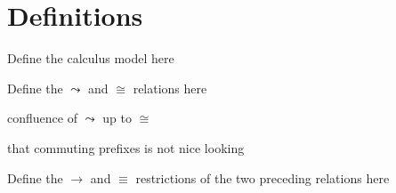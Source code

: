 
\section{Definitions}

\begin{definition}
Define the calculus model here
\end{definition}

\begin{definition}
Define the $\leadsto$ and $\cong$ relations here
\end{definition}

\begin{proposition}
confluence of $\leadsto$ up to $\cong$
\end{proposition}

\remark that commuting prefixes is not nice looking

\begin{definition}
Define the $\to$ and $\equiv$ restrictions of the two preceding relations here
\end{definition}